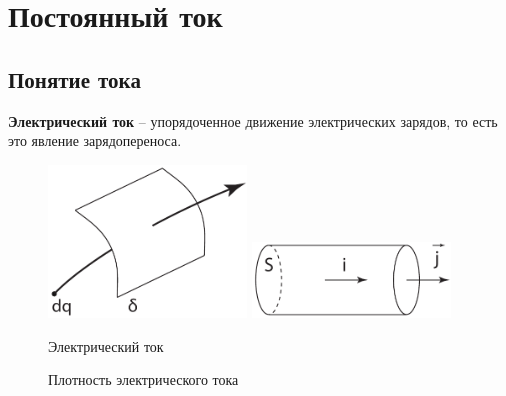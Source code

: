 \chapter{Постоянный ток}

\section{Понятие тока}

    \begin{definition}
        \textbf{Электрический ток} -- упорядоченное движение электрических
        зарядов, то есть это явление зарядопереноса.
    \end{definition}
    
    \begin{figure}[b!]
        \center
        \includegraphics[width=0.47\textwidth]{lec06/current.pdf}
        \hfill
        \includegraphics[width=0.47\textwidth]{lec06/steady_density.pdf}
        \parbox[t]{.47\textwidth}{\caption{Электрический ток}}
        \hfill
        \parbox[t]{.47\textwidth}{\caption{Плотность электрического тока}}
    \end{figure}
 
